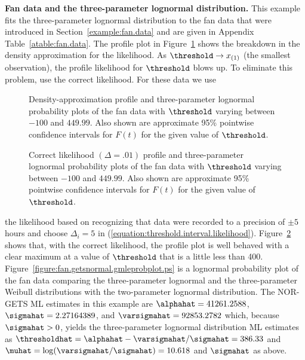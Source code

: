 \begin{example}
{\bf Fan data and the three-parameter lognormal distribution.} This
example fits the three-parameter lognormal distribution to the fan
data that were introduced in Section~\ref{example:fan.data} and are
given in Appendix Table~\ref{atable:fan.data}. The profile plot in
Figure~\ref{figure:fan.thresh.profile.lnor.d0.ps} shows the breakdown
in the density approximation for the likelihood. 
As $\threshold \rightarrow x_{(1)}$ (the smallest observation),
the profile likelihood for $\threshold$ blows up. To eliminate this
problem, use the correct likelihood. For these data we use
\begin{figure}
\caption{Density-approximation profile and three-parameter 
lognormal probability plots of the fan data with $\threshold$ varying
between $-100$ and $449.99$. Also shown are approximate 95\%
pointwise confidence intervals for $F(t)$ for the given value of
$\threshold$.}
\label{figure:fan.thresh.profile.lnor.d0.ps}
\end{figure}
\begin{figure}
\caption{Correct likelihood $(\Delta=.01)$ profile and three-parameter 
lognormal probability plots of the fan data with $\threshold$ varying
between $-100$ and $449.99$. Also shown are approximate 95\%
pointwise confidence intervals for $F(t)$ for the given value of
$\threshold$.}
\label{figure:fan.thresh.profile.lnor.d01.ps}
\end{figure}
the likelihood based on recognizing that data were recorded to a
precision of $\pm5$ hours and choose $\Delta_{i}=5$ in
(\ref{equation:threshold.interval.likelihood}).
Figure~\ref{figure:fan.thresh.profile.lnor.d01.ps} shows that, with
the correct likelihood, the profile plot is well behaved with a
clear maximum at a value of $\threshold$ that is a little less than
400.  Figure~\ref{figure:fan.getsnormal.gmleprobplot.ps} is a
lognormal probability plot of the fan data comparing the
three-parameter lognormal and the three-parameter Weibull
distributions with the two-parameter lognormal distribution.  The
NOR-GETS ML estimates in this example are
$\alphahat=41261.2588$, $\sigmahat =2.27164389$, and
$\varsigmahat=92853.2782$ which, because $\sigmahat>0$, yields the
three-parameter lognormal distribution ML estimates as
$\thresholdhat=\alphahat-\varsigmahat/\sigmahat=386.33$ and
$\muhat=\log(\varsigmahat/\sigmahat)=10.618$ and $\sigmahat$ as above.


\end{example}
